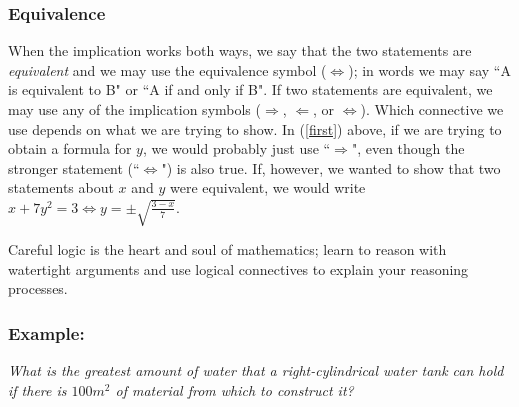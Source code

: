 \secondpage


\subsubsection*{Equivalence}
When the implication works both ways, we say that the two statements
are {\em equivalent} and we may use the equivalence symbol
($\Leftrightarrow$); in words we may say ``A is equivalent to B" or
``A if and only if B".  If two statements are equivalent, we may use
any of the implication symbols ($\Rightarrow$, $\Leftarrow$, or
$\Leftrightarrow$).  Which connective we use depends on what we are
trying to show.  In (\ref{first}) above, if we are trying to obtain a
formula for $y$, we would probably just use ``$\Rightarrow$", even
though the stronger statement (``$\Leftrightarrow$") is also true.
If, however, we wanted to show that two statements about $x$ and $y$
were equivalent, we would write $x + 7y^2 = 3
\Leftrightarrow y = \pm \sqrt{\frac{3-x}{7}}$.


Careful logic is the heart and soul of mathematics; learn to reason with
watertight arguments and use logical connectives to explain your reasoning
processes.

\subsubsection*{Example:}

{\em What is the greatest amount of water that a right-cylindrical water tank
can hold if there is $100 m^2$ of material from which to construct it?}

